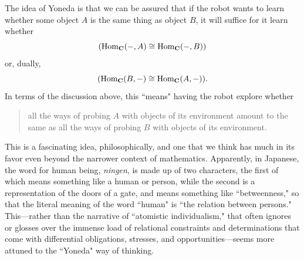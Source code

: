 \documentclass[11pt]{book}
\theoremstyle{definition}
\theoremstyle{definition}
\theoremstyle{definition}
\theoremstyle{theorem}
\theoremstyle{definition}
\begin{document}
The idea of Yoneda is that we can be assured that if the robot wants to learn whether some object $A$ is the same thing as object $B$, it will suffice for it learn whether
\begin{equation*}
(\text{Hom}_{\textbf{C}}(\--, A) \cong  \text{Hom}_{\textbf{C}}(\--, B))  
\end{equation*} 
or, dually, 
\begin{equation*}
(\text{Hom}_{\textbf{C}}(B, \--) \cong  \text{Hom}_{\textbf{C}}(A, \--)).
\end{equation*}
In terms of the discussion above, this ``means" having the robot explore whether
\begin{quote}
	all the ways of probing $A$ with objects of its environment amount to the same as all the ways of probing $B$ with objects of its environment. 
\end{quote}
This is a fascinating idea, philosophically, and one that we think has much in its favor even beyond the narrower context of mathematics. Apparently, in Japanese, the word for human being, \textit{ningen}, is made up of two characters, the first of which means something like a human or person, while the second is a representation of the doors of a gate, and means something like ``betweenness," so that the literal meaning of the word ``human" is ``the relation between persons." This---rather than the narrative of ``atomistic individualism," that often ignores or glosses over the immense load of relational constraints and determinations that come with differential obligations, stresses, and opportunities---seems more attuned to the ``Yoneda" way of thinking. \par   
\end{document}
